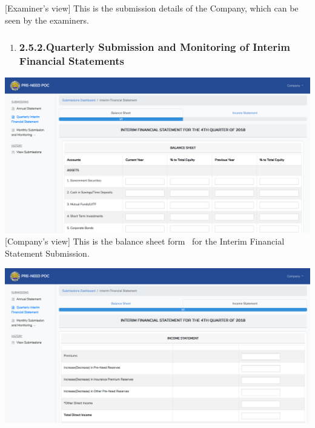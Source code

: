 \documentclass{article}
\begin{document}
[Examiner’s view] This is the submission details of
the Company, which can be seen by the examiners.%

\begin{enumerate}[noitemsep,topsep=\mdcompacttopsep]%

\item{}
\subsubsection{2.5.2.\hspace*{0.5em}Quarterly Submission and Monitoring of Interim Financial Statements}\label{sec-quarterly-submission-and-monitoring-of-interim-financial-statements}%
\end{enumerate}%

\noindent{}\includegraphics[keepaspectratio=true]{up-ic-screens/image114}{}[Company’s view] This is the balance sheet form  for the
Interim Financial Statement Submission.%

\includegraphics[keepaspectratio=true]{up-ic-screens/image127}{}%
\end{document}
